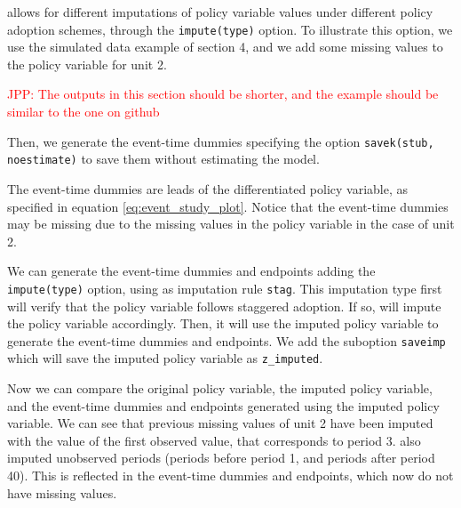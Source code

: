 \documentclass[bib]{./sty/statapress}
\begin{document}
\xtevent allows for different imputations of policy variable values under different policy adoption schemes, through the \texttt{impute(type)} option.
To illustrate this option, we use the simulated data example of section 4, and we add some missing values to the policy variable for unit 2.

\textcolor{red}{JPP: The outputs in this section should be shorter, and the example should be similar to the one on github}

Then, we generate the event-time dummies specifying the option \texttt{savek(stub, noestimate)} to save them without estimating the model.

\begin{stlog}
\nullskip
\end{stlog}

The event-time dummies are leads of the differentiated policy variable, as specified in equation \eqref{eq:event_study_plot}. Notice that the event-time dummies may be missing due to the missing values in the policy variable in the case of unit 2.

\begin{stlog}
\nullskip
\end{stlog}

We can generate the event-time dummies and endpoints adding the \texttt{impute(type)} option, using as imputation rule \texttt{stag}. This imputation type first will verify that the policy variable follows staggered adoption. If so, \xtevent will impute the policy variable accordingly. Then, it will use the imputed policy variable to generate the event-time dummies and endpoints. We add the suboption \texttt{saveimp} which will save the imputed policy variable as \texttt{z\_imputed}.

\begin{stlog}
\nullskip
\end{stlog}

Now we can compare the original policy variable, the imputed policy variable, and the event-time dummies and endpoints generated using the imputed policy variable. We can see that previous missing values of unit 2 have been imputed with the value of the first observed value, that corresponds to period 3. \xtevent also imputed unobserved periods (periods before period 1, and periods after period 40). This is reflected in the event-time dummies and endpoints, which now do not have missing values.
\end{document}
